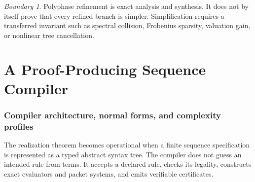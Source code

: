 \documentclass[11pt]{article}
\theoremstyle{definition}\newtheorem{definition}[theorem]{Definition}\newtheorem{example}[theorem]{Example}\newtheorem{construction}[theorem]{Construction}\newtheorem{algorithm}[theorem]{Algorithm}\newtheorem{conjecture}[theorem]{Conjecture}\newtheorem{problem}[theorem]{Problem}
\theoremstyle{remark}\newtheorem{remark}[theorem]{Remark}\newtheorem{boundary}[theorem]{Boundary}\newtheorem{certificate}[theorem]{Computational Certificate}\newtheorem{classical}[theorem]{Classical Input}\newtheorem{principle}[theorem]{Structural Principle}
\begin{document}
\begin{boundary}
Polyphase refinement is exact analysis and synthesis. It does not by itself prove that every refined branch is simpler. Simplification requires a transferred invariant such as spectral collision, Frobenius sparsity, valuation gain, or nonlinear tree cancellation.
\end{boundary}



\part{A Proof-Producing Sequence Compiler}
\section{Compiler architecture, normal forms, and complexity profiles}

The realization theorem becomes operational when a finite sequence specification is represented as a typed abstract syntax tree.  The compiler does not guess an intended rule from terms.  It accepts a declared rule, checks its legality, constructs exact evaluators and packet systems, and emits verifiable certificates.
\end{document}
